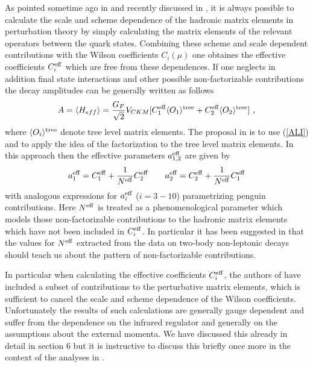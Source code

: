 As pointed sometime ago in \cite{BJLW1,rome2} and recently
discussed in \cite{Cheng,GNF,AKL98},
it is always possible
to calculate the  scale and scheme dependence of the hadronic matrix 
elements in perturbation theory by simply calculating the matrix elements
of the relevant operators between the quark states. 
Combining these scheme and scale dependent contributions with the
Wilson coefficients $C_i(\mu)$ one obtaines the effective coefficients
$C_i^{\rm eff}$ which are free from these dependences. If one neglects
in addition final state interactions and other possible non-factorizable
contributions the decay amplitudes can be generally written as follows
\begin{equation}\label{ALI}
A=\langle H_{eff}\rangle =\frac{G_F}{\sqrt{2}} V_{CKM}
\lbrack C_1^{\rm eff}\langle O_1\rangle^{\rm tree} +C_2^{\rm eff}
\langle O_2\rangle^{\rm tree}  \rbrack~,
\end{equation}
where $\langle O_i\rangle^{\rm tree}$ denote tree level matrix elements.
The proposal in \cite{Cheng,GNF,AKL98} is to use (\ref{ALI}) and to apply 
the idea of the factorization to the tree level matrix elements.
In this approach then the effective parameters $a_{1,2}^{\rm eff}$
are given by 
\begin{equation}\label{BS23F}
a_1^{\rm eff}=C^{\rm eff}_1+\frac{1}{N^{\rm eff}} C^{\rm eff}_2 \qquad
a_2^{\rm eff}=C^{\rm eff}_2+\frac{1}{N^{\rm eff}} C^{\rm eff}_1
\end{equation}
with analogous expressions for $a_{i}^{\rm eff}$ ($i=3-10$) parametrizing
penguin contributions.
Here
$N^{\rm eff}$  is treated as a phenomenological parameter which
models those non-factorizable contributions to the hadronic matrix elements
which have not been included in $C_i^{\rm eff}$.
In particular it has been suggested in \cite{Cheng,GNF,AKL98} that
the values for $N^{\rm eff}$ extracted from the data on two-body
non-leptonic decays should teach us about the pattern of 
non-factorizable contributions.

In particular when calculating the effective coefficients $C_i^{\rm eff}$, 
the authors of  \cite{GNF,AKL98}  have included a
subset of contributions to the perturbative matrix elements, which is
sufficient to cancel the scale and scheme dependence of the Wilson
coefficients.
Unfortunately the results of such calculations are generally gauge
dependent and suffer from the dependence on the infrared regulator
and generally on the assumptions about the external momenta. We
have discussed this already in detail in section 6 but it is instructive
to discuss this briefly once more in the context of the analyses 
in \cite{Cheng,GNF,AKL98}.

